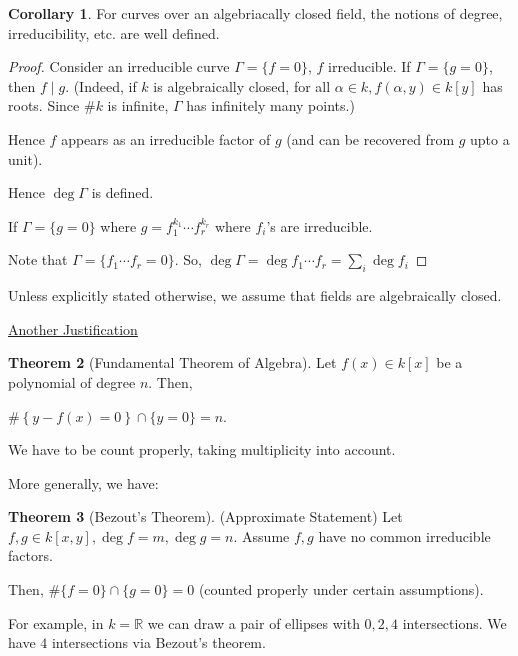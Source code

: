 \documentclass{article}
\theoremstyle{definition}
\newtheorem{theorem}{Theorem}
\newtheorem{corollary}[theorem]{Corollary}
\begin{document}
    \begin{corollary}
        For curves over an algebriacally closed field, the notions of degree, irreducibility, etc. are well defined.
    \end{corollary}

    \begin{proof}
        Consider an irreducible curve \(\Gamma = \{ f = 0 \}\), \(f\) irreducible. If \(\Gamma = \{ g = 0 \}\), then \(f\mid g\). (Indeed, if \(k\) is algebraically closed, for all \(\alpha \in k, f(\alpha,y)\in k[y]\) has roots. Since \(\#k\) is infinite, \(\Gamma\) has infinitely many points.)
        
        Hence \(f\) appears as an irreducible factor of \(g\) (and can be recovered from \(g\) upto a unit).

        Hence \(\deg \Gamma\) is defined.

        If \(\Gamma = \{ g=0 \}\) where \(g = f_1^{k_1}\cdots f_r^{k_r}\) where \(f_i\)'s are irreducible.

        Note that \(\Gamma = \{ f_1 \cdots f_r = 0 \} \). So, \(\deg \Gamma = \deg f_1 \cdots f_r = \sum_{i} \deg f_i\) 
        
    \end{proof}

    Unless explicitly stated otherwise, we assume that fields are algebraically closed.

    \underline{Another Justification}

    \begin{theorem}
        [Fundamental Theorem of Algebra] Let \(f(x)\in k[x]\) be a polynomial of degree \(n\). Then,

        \(\# \left\{ y - f(x) = 0 \right\} \cap \{ y=0 \} = n\).

        We have to be count properly, taking multiplicity into account.
    \end{theorem}

    More generally, we have:

    \begin{theorem}
        [Bezout's Theorem] (Approximate Statement) Let \(f,g\in k[x,y], \deg f = m, \deg g = n\). Assume \(f,g\) have no common irreducible factors.

        Then, \(\#\{ f=0 \} \cap \{ g=0 \} =0\) (counted properly under certain assumptions).
        
        For example, in \(k=\mathbb{R}\) we can draw a pair of ellipses with \(0,2,4\) intersections. We have \(4\) intersections via Bezout's theorem.

    \end{theorem}
\end{document}
